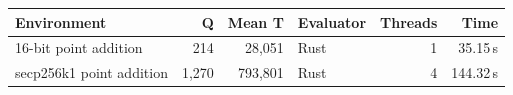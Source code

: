 \begin{tabular}{lrrlrr}
\toprule
Environment & Q & Mean T & Evaluator & Threads & Time \\
\midrule
16-bit point addition & 214 & 28,051 & Rust & 1 & 35.15\,s \\
secp256k1 point addition & 1,270 & 793,801 & Rust & 4 & 144.32\,s \\
\bottomrule
\end{tabular}
